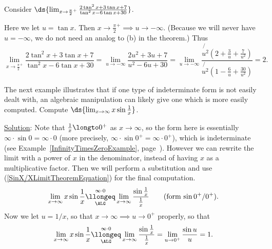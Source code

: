 
\bex Consider $\ds{\lim_{x\to\frac{\pi}2^+}\frac{2\tan^2x+3\tan x+7}
                  {\tan^2 x-6\tan x+30}}$.

Here we let $u=\tan x$. Then $x\to\frac{\pi}2^+\implies u\to-\infty$.
(Because we will never have $u=-\infty$, we do not need an analog
to (b) in the theorem.)  Thus
$$\lim_{x\to\frac{\pi}2^+}\frac{2\tan^2x+3\tan x+7}
                  {\tan^2 x-6\tan x+30}
=\lim_{u\to-\infty}\frac{2u^2+3u+7}{u^2-6u+30}
=\lim_{u\to-\infty}\frac{\not{\!\!u^2}\left(2+\frac3u+\frac7{u^2}\right)}
                        {\not{\!\!u^2}\left(1-\frac6u+\frac{30}{u^2}\right)}
=2.$$\label{ExampleWhereTanX->-InftyW/Substitution}
\eex

The next example illustrates that if one type of indeterminate form
is not easily dealt with, an algebraic manipulation can likely
give one which is more easily computed.
\bex Compute $\ds{\lim_{x\to\infty}x\sin\frac1x}$.

\underline{Solution}: Note that $\frac1x\longto0^+$ as $x\to\infty$, so the 
form here is essentially $\infty\cdot\sin0=\infty\cdot0$ (more precisely,
$\infty\cdot\sin0^+=\infty\cdot0^+$), which
is indeterminate (see Example~\ref{InfinityTimesZeroExample},
page~\pageref{InfinityTimesZeroExample}).
However we can rewrite the limit with a power of $x$ in
the denominator, instead of having $x$ as a multiplicative factor.
Then we will perform a substitution and use 
(\ref{SinX/XLimitTheoremEquation}) for the final computation.
$$\lim_{x\to\infty}x\sin\frac1x
\underset{\ALG}{\overset{\infty\cdot0}{\llongeq}}
\lim_{x\to\infty}\frac{\sin\frac1x}{\frac1x} \qquad
  \text{(form $\sin0^+/0^+$)}.$$
Now we let $u=1/x$, so that $x\to\infty\implies u\to0^+$ properly,
so that
$$\lim_{x\to\infty}x\sin\frac1x
\underset{\ALG}{\overset{\infty\cdot0}{\llongeq}}
\lim_{x\to\infty}\frac{\sin\frac1x}{\frac1x}
=\lim_{u\to0^+}\frac{\sin u}u=1.$$
\eex

